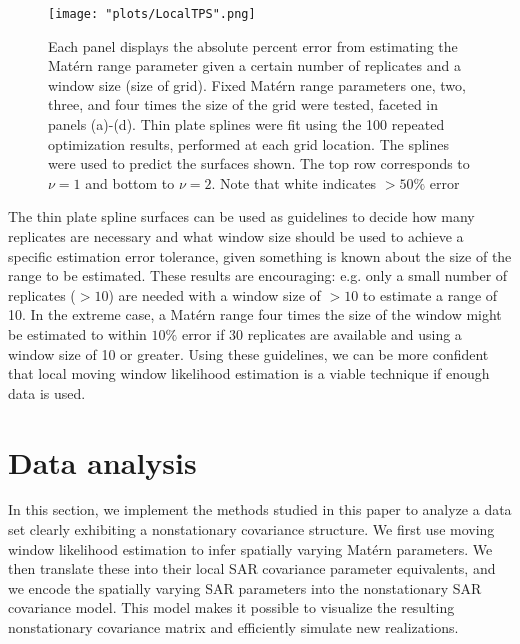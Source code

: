 \documentclass[review]{elsarticle}
\begin{document}
\begin{figure}
    \centering
    \texttt{[image: "plots/LocalTPS".png]}
    \caption{Each panel displays the absolute percent error from estimating the Mat\'ern range parameter given a certain number of replicates and a window size (size of grid). Fixed Mat\'ern range parameters one, two, three, and four times the size of the grid were tested, faceted in panels (a)-(d). Thin plate splines were fit using the 100 repeated optimization results, performed at each grid location. The splines were used to predict the surfaces shown. The top row corresponds to $\nu=1$ and bottom to $\nu=2$. Note that white indicates $>50\%$ error}
    \label{f:2}
\end{figure}

The thin plate spline surfaces can be used as guidelines to decide how many replicates are necessary and what window size should be used to achieve a specific estimation error tolerance, given something is known about the size of the range to be estimated. These results are encouraging: e.g. only a small number of replicates ($>10$) are needed with a window size of $>10$ to estimate a range of 10. In the extreme case, a Mat\'ern range four times the size of the window might be estimated to within $10\%$ error if 30 replicates are available and using a window size of 10 or greater. Using these guidelines, we can be more confident that local moving window likelihood estimation is a viable technique if enough data is used.















\section{Data analysis}

In this section, we implement the methods studied in this paper to analyze a data set clearly exhibiting a nonstationary covariance structure. We first use moving window likelihood estimation to infer spatially varying Mat\'ern parameters. We then translate these into their local SAR covariance parameter equivalents, and we encode the spatially varying SAR parameters into the nonstationary SAR covariance model. This model makes it possible to visualize the resulting nonstationary covariance matrix and efficiently simulate new realizations.
\end{document}
